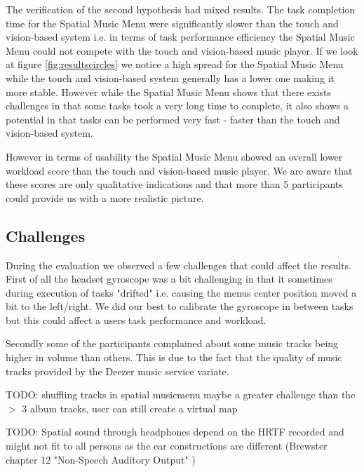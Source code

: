 The verification of the second hypothesis had mixed results. The task completion time for the Spatial Music Menu were significantly slower than the touch and vision-based system i.e. in terms of task performance efficiency the Spatial Music Menu could not compete with the touch and vision-based music player. If we look at figure \ref{fig:resultscircles} we notice a high spread for the Spatial Music Menu while the touch and vision-based system generally has a lower one making it more stable. However while the Spatial Music Menu shows that there exists challenges in that some tasks took a very long time to complete, it also shows a potential in that tasks can be performed very fast - faster than the touch and vision-based system.

However in terms of usability the Spatial Music Menu showed an overall lower workload score than the touch and vision-based music player. We are aware that these scores are only qualitative indications and that more than 5 participants could provide us with a more realistic picture.

\subsection{Challenges}
During the evaluation we observed a few challenges that could affect the results. First of all the headset gyroscope was a bit challenging in that it sometimes during execution of tasks "drifted" i.e. causing the menus center position moved a bit to the left/right. We did our best to calibrate the gyroscope in between tasks but this could affect a users task performance and workload.

Secondly some of the participants complained about some music tracks being higher in volume than others. This is due to the fact that the quality of music tracks provided by the Deezer music service variate.

TODO: shuffling tracks in spatial musicmenu maybe a greater challenge than the $>$ 3 album tracks, user can still create a virtual map

TODO: Spatial sound through headphones depend on the HRTF recorded and might not fit to all persons as the ear constructions are different (Brewster chapter 12 "Non-Speech Auditory Output" \cite{brewster_human-computer_2003})
















